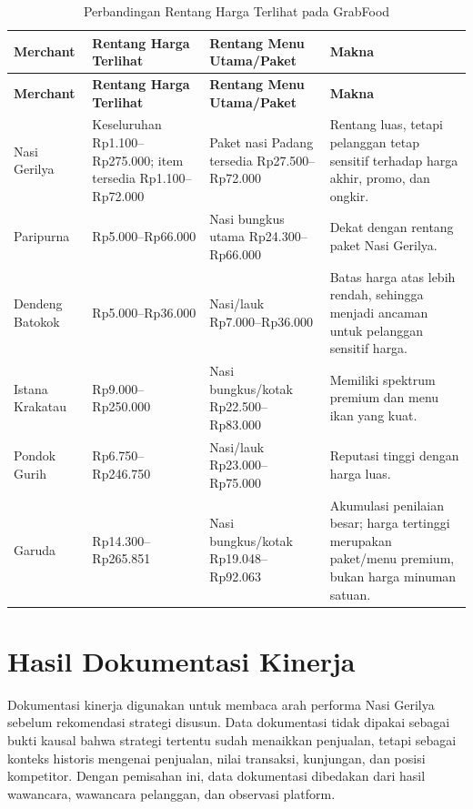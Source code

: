 \begingroup
    \scriptsize
    \begin{xltabular}{\textwidth}{|Z{2.45cm}|Z{2.75cm}|Z{3.1cm}|Y|}
        \caption{Perbandingan Rentang Harga Terlihat pada GrabFood}
        \label{tab:perbandingan-rentang-harga-kompetitor-bab4}\\
        \toprule
        \textbf{Merchant} & \textbf{Rentang Harga Terlihat} & \textbf{Rentang Menu Utama/Paket} & \textbf{Makna} \\ \hline
        \midrule
        \endfirsthead
        \toprule
        \textbf{Merchant} & \textbf{Rentang Harga Terlihat} & \textbf{Rentang Menu Utama/Paket} & \textbf{Makna} \\ \hline
        \midrule
        \endhead
        \endfoot
        \bottomrule
        \endlastfoot
        Nasi Gerilya & Keseluruhan Rp1.100--Rp275.000; item tersedia Rp1.100--Rp72.000 & Paket nasi Padang tersedia Rp27.500--Rp72.000 & Rentang luas, tetapi pelanggan tetap sensitif terhadap harga akhir, promo, dan ongkir. \\ \hline
        Paripurna & Rp5.000--Rp66.000 & Nasi bungkus utama Rp24.300--Rp66.000 & Dekat dengan rentang paket Nasi Gerilya. \\ \hline
        Dendeng Batokok & Rp5.000--Rp36.000 & Nasi/lauk Rp7.000--Rp36.000 & Batas harga atas lebih rendah, sehingga menjadi ancaman untuk pelanggan sensitif harga. \\ \hline
        Istana Krakatau & Rp9.000--Rp250.000 & Nasi bungkus/kotak Rp22.500--Rp83.000 & Memiliki spektrum premium dan menu ikan yang kuat. \\ \hline
        Pondok Gurih & Rp6.750--Rp246.750 & Nasi/lauk Rp23.000--Rp75.000 & Reputasi tinggi dengan harga luas. \\ \hline
        Garuda & Rp14.300--Rp265.851 & Nasi bungkus/kotak Rp19.048--Rp92.063 & Akumulasi penilaian besar; harga tertinggi merupakan paket/menu premium, bukan harga minuman satuan. \\ \hline
    \end{xltabular}
\endgroup

\section{Hasil Dokumentasi Kinerja}
Dokumentasi kinerja digunakan untuk membaca arah performa Nasi Gerilya sebelum rekomendasi strategi disusun. Data dokumentasi tidak dipakai sebagai bukti kausal bahwa strategi tertentu sudah menaikkan penjualan, tetapi sebagai konteks historis mengenai penjualan, nilai transaksi, kunjungan, dan posisi kompetitor. Dengan pemisahan ini, data dokumentasi dibedakan dari hasil wawancara, wawancara pelanggan, dan observasi platform.

